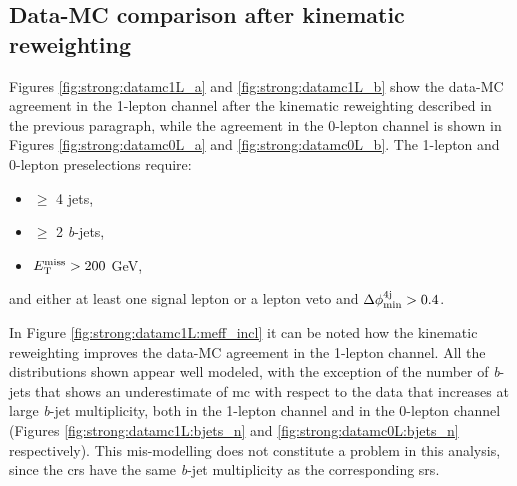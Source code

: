 \subsection{Data-MC comparison after kinematic reweighting}

Figures \ref{fig:strong:datamc1L_a} and \ref{fig:strong:datamc1L_b} show the data-MC agreement in the 1-lepton channel after the 
kinematic reweighting described in the previous paragraph, while 
the agreement in the 0-lepton channel is shown in Figures \ref{fig:strong:datamc0L_a} and \ref{fig:strong:datamc0L_b}.
The 1-lepton and 0-lepton preselections require:
\begin{itemize}
\item $\geq$ 4 jets,
\item $\geq$ 2 \textit{b}-jets,
\item $E_{\rm T}^{\mathrm{miss}} > 200$ GeV, 
\end{itemize}
and either at least one signal lepton or a lepton veto and $\Delta\phi_{\rm{min}}^{4{\rm{j}}} > 0.4$.

In Figure \ref{fig:strong:datamc1L:meff_incl} it can be noted how the kinematic reweighting improves the data-MC agreement in
the 1-lepton channel. 
All the distributions shown appear well modeled, with the exception of the number of \textit{b}-jets 
that shows an underestimate of \gls{mc} with respect to the data that increases at large \textit{b}-jet multiplicity, both in 
the 1-lepton channel and in the 0-lepton channel 
(Figures \ref{fig:strong:datamc1L:bjets_n} and \ref{fig:strong:datamc0L:bjets_n} respectively).
This mis-modelling does not constitute a problem in this analysis, 
since the \glspl{cr} have the same \textit{b}-jet multiplicity as the corresponding \glspl{sr}.



